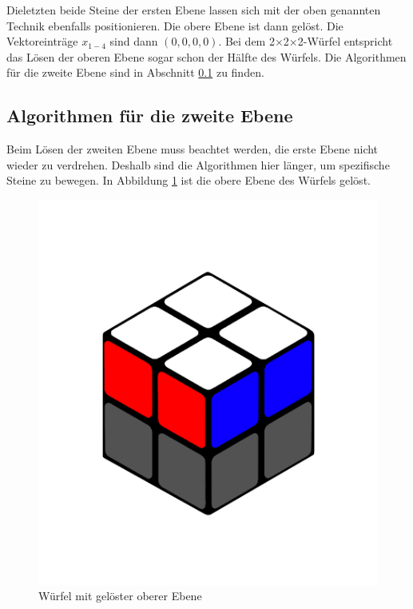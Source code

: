 \documentclass[12pt,a4paper, usenames, dvipsnames]{article}
\theoremstyle{mystyle}
\theoremstyle{definition}
\newcommand{\Ttwo}{2$\times$2$\times$2-}
\begin{document}
Dieletzten beide Steine der ersten Ebene lassen sich mit der oben genannten Technik ebenfalls positionieren. Die obere Ebene ist dann gelöst. Die Vektoreinträge $x_{1-4}$ sind dann $(0,0,0,0)$.
Bei dem \Ttwo Würfel entspricht das Lösen der oberen Ebene sogar schon der Hälfte des Würfels. Die Algorithmen für die zweite Ebene sind in Abschnitt \ref{Abschnitt_AlgorithmenZweiteEbene} zu finden.



%
%
%
%
%
%
%
%
%
%
%
%
%
%
%
%
%
%
%
\subsection{Algorithmen für die zweite Ebene}
\label{Abschnitt_AlgorithmenZweiteEbene}

Beim Lösen der zweiten Ebene muss beachtet werden, die erste Ebene nicht wieder zu verdrehen. Deshalb sind die Algorithmen hier länger, um spezifische Steine zu bewegen.
In Abbildung \ref{Abbildung_GelösteObereEbene} ist die obere Ebene des Würfels gelöst. 

\begin{figure}[H]
\centering
\includegraphics[scale=0.1]{ebene.png}
\caption{Würfel mit gelöster oberer Ebene}
\label{Abbildung_GelösteObereEbene}
\end{figure}
\end{document}
